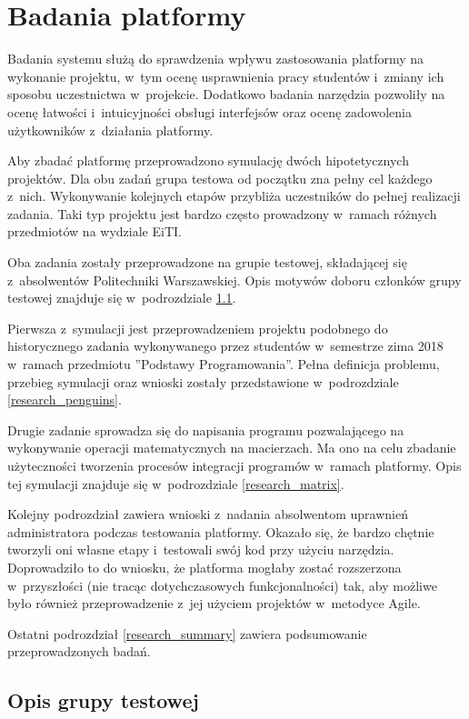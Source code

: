 \chapter{Badania platformy}
\label{chapter:research}

Badania systemu służą do sprawdzenia wpływu zastosowania platformy na wykonanie projektu, w~tym ocenę usprawnienia pracy studentów i~zmiany ich sposobu uczestnictwa w~projekcie.
Dodatkowo badania narzędzia pozwoliły na ocenę łatwości i~intuicyjności obsługi interfejsów oraz ocenę zadowolenia użytkowników z~działania platformy.

Aby zbadać platformę przeprowadzono symulację dwóch hipotetycznych projektów.
Dla obu zadań grupa testowa od początku zna pełny cel każdego z~nich.
Wykonywanie kolejnych etapów przybliża uczestników do pełnej realizacji zadania.
Taki typ projektu jest bardzo często prowadzony w~ramach różnych przedmiotów na wydziale EiTI.

Oba zadania zostały przeprowadzone na grupie testowej, składającej się z~absolwentów Politechniki Warszawskiej.
Opis motywów doboru członków grupy testowej znajduje się w~podrozdziale \ref{research_group}.

Pierwsza z~symulacji jest przeprowadzeniem projektu podobnego do historycznego zadania wykonywanego przez studentów w~semestrze zima 2018 w~ramach przedmiotu ”Podstawy Programowania”.
Pełna definicja problemu, przebieg symulacji oraz wnioski zostały przedstawione w~podrozdziale \ref{research_penguins}.

Drugie zadanie sprowadza się do napisania programu pozwalającego na wykonywanie operacji matematycznych na macierzach.
Ma ono na celu zbadanie użyteczności tworzenia procesów integracji programów w~ramach platformy.
Opis tej symulacji znajduje się w~podrozdziale \ref{research_matrix}.

Kolejny podrozdział zawiera wnioski z~nadania absolwentom uprawnień administratora podczas testowania platformy.
Okazało się, że bardzo chętnie tworzyli oni własne etapy i~testowali swój kod przy użyciu narzędzia.
Doprowadziło to do wniosku, że platforma mogłaby zostać rozszerzona w~przyszłości (nie tracąc dotychczasowych funkcjonalności) tak, aby możliwe było również przeprowadzenie z~jej użyciem projektów w~metodyce Agile.

Ostatni podrozdział \ref{research_summary} zawiera podsumowanie przeprowadzonych badań.


\section{Opis grupy testowej}
\label{research_group}

